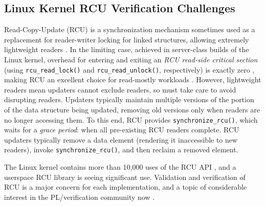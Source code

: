 \documentclass[conference]{IEEEtran}
\begin{document}
\subsection{Linux Kernel RCU Verification Challenges}



Read-Copy-Update (RCU) is a synchronization mechanism sometimes used as a replacement
for reader-writer locking for linked structures, allowing extremely
lightweight readers \cite{McKenney:2013:SDS:2483852.2483867}.
In the limiting case, achieved in server-class builds of the
Linux kernel, overhead for entering and exiting an \emph{RCU read-side
critical section} (using {\tt rcu\_read\_lock()} and {\tt rcu\_read\_unlock()},
respectively) is exactly zero \cite{McKenney98}, making RCU an
excellent choice for read-mostly workloads \cite{McKenney:2013:SDS:2483852.2483867,DinakarGuniguntala2008IBMSysJ,PaulMcKenney2013AMPenergyHOTPAR}.
However, lightweight readers mean updaters cannot exclude readers,
so must take care to avoid disrupting readers.
Updaters typically maintain multiple versions of the portion of the
data structure being updated, removing old versions only when
readers are no longer accessing them.
To this end, RCU provides {\tt synchronize\_rcu()}, which waits for a
\emph{grace period}: when all pre-existing RCU readers complete.
RCU updaters typically remove a data element (rendering it
inaccessible to new readers), invoke {\tt synchronize\_rcu()},
and then reclaim a removed element.

The Linux kernel contains more than 10,000 uses of the RCU
API \cite{PaulEMcKenneyRCUusagePage}, and a userspace RCU
library \cite{MathieuDesnoyers2009URCU,MathieuDesnoyers2012URCU}
is seeing significant use.  Validation and verification of RCU is a
major concern for each implementation, and a topic of considerable
interest in the PL/verification community now \cite{PLDI15RCU}.

\end{document}

